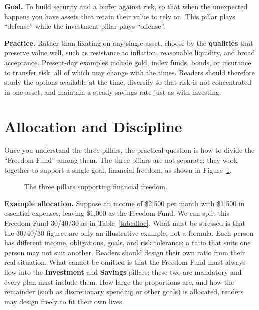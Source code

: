 \documentclass[10pt,a4paper,twocolumn]{article}
\begin{document}
\textbf{Goal.} To build security and a buffer against risk, so that when the unexpected happens you have assets that retain their value to rely on. This pillar plays ``defense'' while the investment pillar plays ``offense''.

\textbf{Practice.} Rather than fixating on any single asset, choose by the \textbf{qualities} that preserve value well, such as resistance to inflation, reasonable liquidity, and broad acceptance. Present-day examples include gold, index funds, bonds, or insurance to transfer risk, all of which may change with the times. Readers should therefore study the options available at the time, diversify so that risk is not concentrated in one asset, and maintain a steady savings rate just as with investing.

\section{Allocation and Discipline}
Once you understand the three pillars, the practical question is how to divide the ``Freedom Fund'' among them. The three pillars are not separate; they work together to support a single goal, financial freedom, as shown in Figure~\ref{fig:pillars}.

\begin{figure}[t]
\centering
{}
\caption{The three pillars supporting financial freedom.}
\label{fig:pillars}
\end{figure}

\textbf{Example allocation.} Suppose an income of \$2{,}500 per month with \$1{,}500 in essential expenses, leaving \$1{,}000 as the Freedom Fund. We can split this Freedom Fund 30/40/30 as in Table~\ref{tab:alloc}. What must be stressed is that the 30/40/30 figures are only an illustrative example, not a formula. Each person has different income, obligations, goals, and risk tolerance; a ratio that suits one person may not suit another. Readers should design their own ratio from their real situation. What cannot be omitted is that the Freedom Fund must always flow into the \textbf{Investment} and \textbf{Savings} pillars; these two are mandatory and every plan must include them. How large the proportions are, and how the remainder (such as discretionary spending or other goals) is allocated, readers may design freely to fit their own lives.
\end{document}
